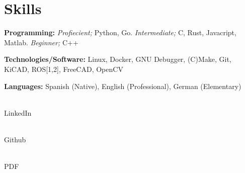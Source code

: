 \documentclass[letterpaper,11pt]{article}
\newcommand{\resumeSubHeadingListStart}{\begin{itemize}[leftmargin=0.15in, label={}]}
\newcommand{\resumeSubHeadingListEnd}{\end{itemize}}
\begin{document}
\section{Skills}
  \vspace{2pt}
  \resumeSubHeadingListStart
    \small{\item{
        \textbf{Programming:}{
	    \textit{Profiecient;} Python, Go.
	    \textit{Intermediate;} C, Rust, Javacript, Matlab.
	    \textit{Beginner;} C++} \\
	\vspace{3pt}
        
	\textbf{Technologies/Software:}{ Linux, Docker, GNU Debugger, (C)Make, Git, KiCAD, ROS[1,2], FreeCAD, OpenCV} \\ \vspace{3pt}
        
        \textbf{Languages:}{ Spanish (Native), English (Professional), German (Elementary)}
        
    }}
  \resumeSubHeadingListEnd


\setlength{\columnsep}{-10cm} %

\begin{center}
    \begin{multicols}{3}
	 \vspace{2pt} \\ LinkedIn

	 \vspace{2pt} \\ Github

	 \vspace{2pt} \\ PDF
    \end{multicols}
\end{center}
\end{document}
